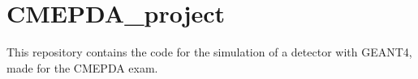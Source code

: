 \chapter{CMEPDA\+\_\+project}
\hypertarget{md__r_e_a_d_m_e}{}\label{md__r_e_a_d_m_e}
\label{md__r_e_a_d_m_e_autotoc_md0}%
%


This repository contains the code for the simulation of a detector with GEANT4, made for the CMEPDA exam. 